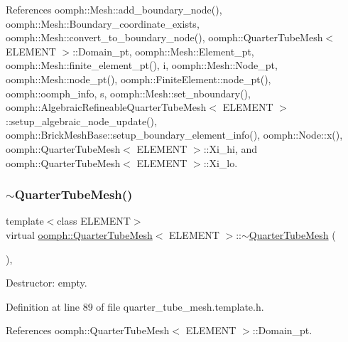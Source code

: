 References oomph\+::\+Mesh\+::add\+\_\+boundary\+\_\+node(), oomph\+::\+Mesh\+::\+Boundary\+\_\+coordinate\+\_\+exists, oomph\+::\+Mesh\+::convert\+\_\+to\+\_\+boundary\+\_\+node(), oomph\+::\+Quarter\+Tube\+Mesh$<$ E\+L\+E\+M\+E\+N\+T $>$\+::\+Domain\+\_\+pt, oomph\+::\+Mesh\+::\+Element\+\_\+pt, oomph\+::\+Mesh\+::finite\+\_\+element\+\_\+pt(), i, oomph\+::\+Mesh\+::\+Node\+\_\+pt, oomph\+::\+Mesh\+::node\+\_\+pt(), oomph\+::\+Finite\+Element\+::node\+\_\+pt(), oomph\+::oomph\+\_\+info, s, oomph\+::\+Mesh\+::set\+\_\+nboundary(), oomph\+::\+Algebraic\+Refineable\+Quarter\+Tube\+Mesh$<$ E\+L\+E\+M\+E\+N\+T $>$\+::setup\+\_\+algebraic\+\_\+node\+\_\+update(), oomph\+::\+Brick\+Mesh\+Base\+::setup\+\_\+boundary\+\_\+element\+\_\+info(), oomph\+::\+Node\+::x(), oomph\+::\+Quarter\+Tube\+Mesh$<$ E\+L\+E\+M\+E\+N\+T $>$\+::\+Xi\+\_\+hi, and oomph\+::\+Quarter\+Tube\+Mesh$<$ E\+L\+E\+M\+E\+N\+T $>$\+::\+Xi\+\_\+lo.

\mbox{\label{classoomph_1_1QuarterTubeMesh_aeb6ec7337a9e1666ebc6c942e788bab7}} 
\subsubsection{\texorpdfstring{$\sim$\+Quarter\+Tube\+Mesh()}{~QuarterTubeMesh()}}
{\footnotesize\ttfamily template$<$class E\+L\+E\+M\+E\+NT$>$ \\
virtual \hyperlink{classoomph_1_1QuarterTubeMesh}{oomph\+::\+Quarter\+Tube\+Mesh}$<$ E\+L\+E\+M\+E\+NT $>$\+::$\sim$\hyperlink{classoomph_1_1QuarterTubeMesh}{Quarter\+Tube\+Mesh} (\begin{DoxyParamCaption}{ }\end{DoxyParamCaption})\hspace{0.3cm}{\ttfamily [inline]}, {\ttfamily [virtual]}}



Destructor\+: empty. 



Definition at line 89 of file quarter\+\_\+tube\+\_\+mesh.\+template.\+h.



References oomph\+::\+Quarter\+Tube\+Mesh$<$ E\+L\+E\+M\+E\+N\+T $>$\+::\+Domain\+\_\+pt.




